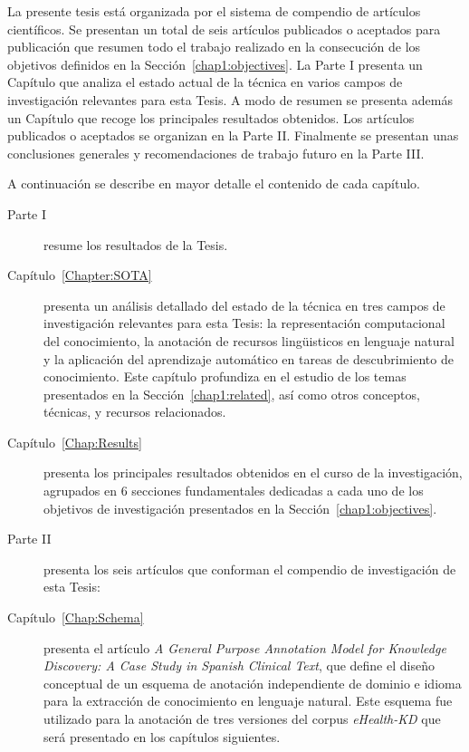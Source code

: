 La presente tesis está organizada por el sistema de compendio de artículos científicos. Se presentan un total de seis artículos publicados o aceptados para publicación que resumen todo el trabajo realizado en la consecución de los objetivos definidos en la Sección~\ref{chap1:objectives}.
La Parte I presenta un Capítulo que analiza el estado actual de la técnica en varios campos de investigación relevantes para esta Tesis.
A modo de resumen se presenta además un Capítulo que recoge los principales resultados obtenidos.
Los artículos publicados o aceptados se organizan en la Parte II.
Finalmente se presentan unas conclusiones generales y recomendaciones de trabajo futuro en la Parte III.

A continuación se describe en mayor detalle el contenido de cada capítulo.

\begin{description}
\item[Parte I] resume los resultados de la Tesis.

\item[Capítulo~\ref{Chapter:SOTA}] presenta un análisis detallado del estado de la técnica en tres campos de investigación relevantes para esta Tesis: la representación computacional del conocimiento, la anotación de recursos lingüisticos en lenguaje natural y la aplicación del aprendizaje automático en tareas de descubrimiento de conocimiento. Este capítulo profundiza en el estudio de los temas presentados en la Sección~\ref{chap1:related}, así como otros conceptos, técnicas, y recursos relacionados.

\item [Capítulo~\ref{Chap:Results}] presenta los principales resultados obtenidos en el curso de la investigación, agrupados en 6 secciones fundamentales dedicadas a cada uno de los objetivos de investigación presentados en la Sección~\ref{chap1:objectives}.

\item[Parte II] presenta los seis artículos que conforman el compendio de investigación de esta Tesis:

\item [Capítulo~\ref{Chap:Schema}] presenta el artículo \textit{A General Purpose Annotation Model for Knowledge Discovery: A Case Study in Spanish Clinical Text}, que define el diseño conceptual de un esquema de anotación independiente de dominio e idioma para la extracción de conocimiento en lenguaje natural. Este esquema fue utilizado para la anotación de tres versiones del corpus \textit{eHealth-KD} que será presentado en los capítulos siguientes.


\end{description}
